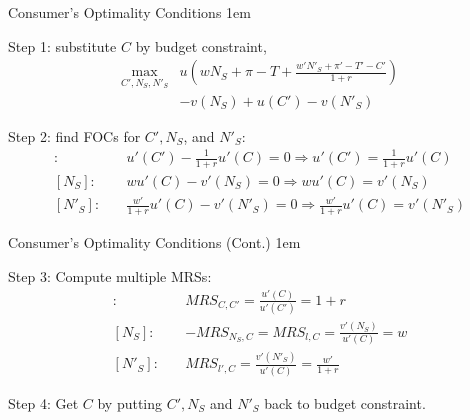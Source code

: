 \documentclass[11pt,aspectratio=43]{beamer}
\let\olditemize=\itemize
\let\endolditemize=\enditemize
\renewenvironment{itemize}{\olditemize \itemsep1em}{\endolditemize}
\theoremstyle{definition}
\begin{document}
\begin{frame}{Consumer's Optimality Conditions}
\label{slide:Consumer_s_Optimality_Conditions}
\begin{itemize}
    \item Step 1: substitute $ C $ by budget constraint,
        \begin{align*}
            \max_{C', N_{S}, N'_{S}}
                & u\left(
                    w N_{S} + \pi - T + \frac{w' N'_{S} + \pi' - T' - C'}{1+r}
                   \right)
            \\
                & - v( N_{S} ) + u( C' ) - v( N'_{S} )
        \end{align*}
    \item Step 2: find FOCs for $ C', N_{S} $, and $ N'_{S} $:
    \begin{align*}
        [C']: \quad
            & u'( C' ) - \frac{1}{1+r}u'( C ) = 0 \Rightarrow u'( C' ) = \frac{1}{1+r} u'( C )
        \\
        [ N_{S} ]: \quad
            & w u'( C ) - v'( N_{S} ) = 0 \Rightarrow w u'( C ) = v'( N_{S} )
        \\
        [ N'_{S} ]: \quad
            & \frac{w'}{1+r} u'( C ) - v'( N'_{S} ) = 0 \Rightarrow \frac{w'}{1+r} u'( C ) = v'( N'_{S} )
    \end{align*}
\end{itemize}
\end{frame}

\begin{frame}{Consumer's Optimality Conditions (Cont.)}
\label{slide:Consumer_s_Optimality_Conditions__Cont__}
    \begin{itemize}
        \item Step 3: Compute multiple MRSs:
        \begin{align*}
            [C']: \quad
                & MRS_{C, C'} = \frac{u'( C )}{u'( C' )} = 1+r
            \\
            [ N_{S} ]: \quad
                & -MRS_{N_{S}, C} = MRS_{l, C} = \frac{v'( N_{S} )}{u'( C )} = w
            \\
            [ N'_{S} ]: \quad
                & MRS_{l', C} = \frac{v'( N'_{S} )}{u'( C )} = \frac{w'}{1+r}
        \end{align*}
        \item Step 4: Get $ C $ by putting $ C', N_{S} $ and $ N'_{S} $ back to budget constraint.
    \end{itemize}
\end{frame}
\end{document}
